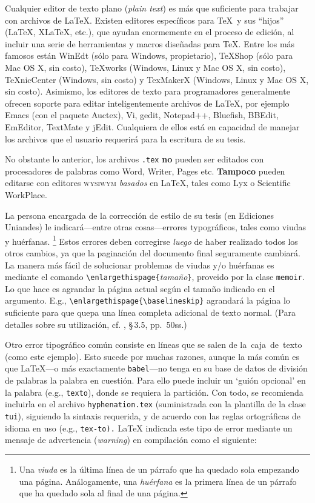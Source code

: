\documentclass[11pt,
              article,
              oneside
              ]{memoir}
\newcommand*{\comando}[1]{\texttt{#1}}
\newcommand*{\paquete}[1]{\texttt{\color{NavyBlue}#1}\xspace}
\newcommand*{\tui}{{\normalfont\paquete{tui}}\xspace}
\newcommand*{\MEMOIR}{\paquete{memoir}}
\newcommand*{\XeLaTeX}{X\hspace*{-2pt}\raisebox{-2pt}{\rotatebox[origin=c]{-180}{E}}\LaTeX\xspace}
\begin{document}
\begin{compactenum}
  \item Cualquier editor de texto plano (\textit{plain text}) es más que suficiente para trabajar con archivos de \LaTeX. Existen editores específicos para \TeX\ y sus \enquote{hijos} (\LaTeX,  \XeLaTeX, etc.), que ayudan enormemente en el proceso de edición, al incluir una serie de herramientas y macros diseñadas para \TeX. Entre los más famosos están WinEdt (sólo para Windows, propietario), TeXShop (sólo para Mac OS X, sin costo), TeXworks (Windows, Linux y Mac OS X, sin costo), TeXnicCenter (Windows, sin costo) y TexMakerX (Windows, Linux y Mac OS X, sin costo). Asimismo, los editores de texto para programadores generalmente ofrecen soporte para editar inteligentemente archivos de \LaTeX, por ejemplo Emacs (con el paquete Auctex), Vi, gedit, Notepad++, Bluefish, BBEdit, EmEditor, TextMate y jEdit. Cualquiera de ellos está en capacidad de manejar los archivos que el usuario requerirá para la escritura de su tesis.
  \item No obstante lo anterior, los archivos \comando{.tex} \textbf{no} pueden ser editados con procesadores de palabras como Word, Writer, Pages etc. \textbf{Tampoco} pueden editarse con editores \textsc{wysiwym} \textit{basados} en \LaTeX, tales como Lyx o Scientific WorkPlace.
  \item La persona encargada de la corrección de estilo de su tesis (en Ediciones Uniandes) le indicará---entre otras cosas---errores typográficos, tales como viudas y huérfanas.%
	\footnote{Una \emph{viuda} es la última línea de un párrafo que ha quedado sola empezando una página. Análogamente, una \emph{huérfana} es la primera línea de un párrafo que ha quedado sola al final de una página.}
Estos errores deben corregirse \emph{luego} de haber realizado todos los otros cambios, ya que la paginación del documento final seguramente cambiará. La manera más fácil de solucionar problemas de viudas y/o huérfanas es mediante el comando \verb+\enlargethispage{+\emph{tamaño}\verb+}+, proveido por la clase \MEMOIR. Lo que hace es agrandar la página actual según el tamaño indicado en el argumento. E.g., 
\verb+\enlargethispage{\baselineskip}+ agrandará la página lo suficiente para que quepa una línea completa adicional de texto normal. (Para detalles sobre su utilización, cf. \cite{MEMOIR}, \S\,3.5, pp.\, 50ss.)
	\item Otro error tipográfico común consiste en líneas que se salen de \hbox{la caja de texto} (como este ejemplo). Esto sucede por muchas razones, aunque la más común es que \LaTeX---o más exactamente \comando{babel}---no tenga en su base de datos de división de palabras la palabra en cuestión. Para ello puede incluir un `guión opcional' en la palabra (e.g., \comando{tex\-to}), donde se requiera la partición. Con todo, se recomienda incluirla en el archivo \comando{hyphenation.tex} (suministrada con la plantilla de la clase \tui), siguiendo la sintaxis requerida, y de acuerdo con las reglas ortográficas de idioma en uso (e.g., \comando{tex-to).} \LaTeX{} indicada este tipo de error mediante un mensaje de advertencia (\emph{warning}) en compilación como el siguiente:\\[-6pt]

\end{compactenum}
\end{document}
